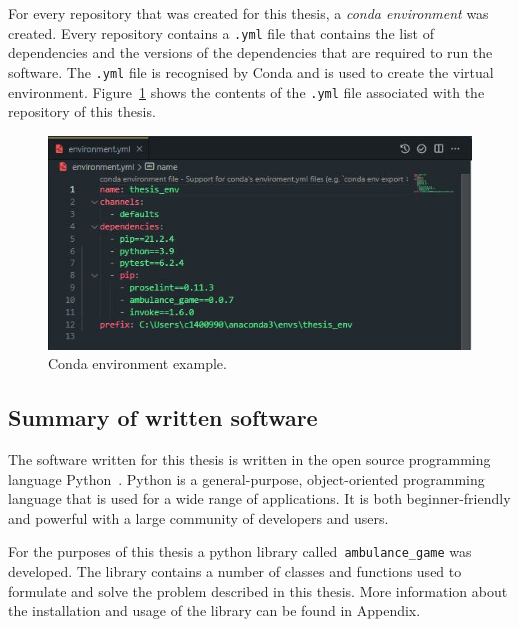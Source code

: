 For every repository that was created for this thesis, a
\textit{conda environment} was created.
Every repository contains a \texttt{.yml} file that contains the list of
dependencies and the versions of the dependencies that are required to run the
software.
The \texttt{.yml} file is recognised by Conda and is used to create the virtual
environment.
Figure~\ref{fig:conda_environment} shows the contents of the \texttt{.yml} file
associated with the repository of this thesis.

\begin{figure}[H]
    \includegraphics[width=\linewidth]{chapters/01_introduction/Bin/environment.JPG}
    \caption{Conda environment example.}
    \label{fig:conda_environment}
\end{figure}



\subsection{Summary of written software}

The software written for this thesis is written in the open source programming
language Python~\cite{van1995python}.
Python is a general-purpose, object-oriented programming language that is used
for a wide range of applications.
It is both beginner-friendly and powerful with a large community of developers
and users.

For the purposes of this thesis a python library called~\texttt{ambulance\_game}
was developed.
The library contains a number of classes and functions used to formulate and
solve the problem described in this thesis.
More information about the installation and usage of the library can be found
in Appendix. %

